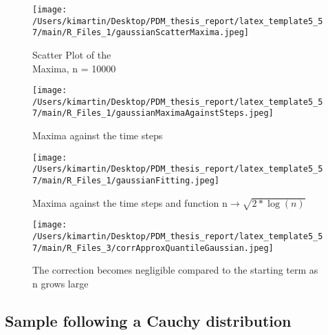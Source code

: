 \begin{figure}[h!]
	\centering
	\begin{minipage}[b]{0.4\textwidth}
        \centering
        \texttt{[image: /Users/kimartin/Desktop/PDM\_thesis\_report/latex\_template5\_57/main/R\_Files\_1/gaussianScatterMaxima.jpeg]}
        \caption{Scatter Plot of the \\Maxima, n = 10000}
        \label{fig:toyingLimitGaussianScatter}
	\end{minipage}
	\begin{minipage}[b]{0.4\textwidth}
		        \centering
		        \texttt{[image: /Users/kimartin/Desktop/PDM\_thesis\_report/latex\_template5\_57/main/R\_Files\_1/gaussianMaximaAgainstSteps.jpeg]}
		        \caption{Maxima against the time steps}
		        \label{fig:toyingLimitGaussianAgainst}
	\end{minipage}
 \end{figure}
 \begin{figure}[h!]
       \centering
       \texttt{[image: /Users/kimartin/Desktop/PDM\_thesis\_report/latex\_template5\_57/main/R\_Files\_1/gaussianFitting.jpeg]}
       \caption{Maxima against the time steps and function n$\rightarrow \sqrt{2*\log(n)}$}
       \label{fig:toyingLimitGaussianFitting}
\end{figure}
 \begin{figure}[h!]
 	\centering
 	\texttt{[image: /Users/kimartin/Desktop/PDM\_thesis\_report/latex\_template5\_57/main/R\_Files\_3/corrApproxQuantileGaussian.jpeg]}
 	\caption{The correction becomes negligible compared to the starting term as n grows large}
 	\label{fig:toyingLimitGaussianCorr}
 \end{figure}
\subsection{Sample following a Cauchy distribution}
